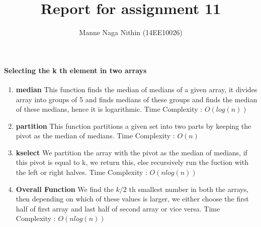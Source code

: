 \documentclass[a4paper,11pt]{article}
\title{Report for assignment 11}
\author{Manne Naga Nithin (14EE10026)}
\begin{document}
\maketitle
\paragraph{Selecting the k th element in two arrays}
\begin{enumerate}

 \item \textbf{median}\newline
This function finds the median of medians of a given array, it divides array into groups of 5 and finds medians of these groups and finds the median of these medians, hence it is logarithmic.\newline
 Time Complexity : $O(log(n))$
 \item \textbf{partition}\newline
 This function partitions a given set into two parts by keeping the pivot as the median of medians.\newline
 Time Complexity : $O(n)$
 \item \textbf{kselect}\newline
 We partition the array with the pivot as the median of medians, if this pivot is equal to k, we return this, else recursively run the fuction with the left or right halves.\newline
 Time Complexity : $O(nlog(n))$
 \item \textbf{Overall Function}\newline
 We find the $k/2$ th smallest number in both the arrays, then depending on which of these values is larger, we either choose the first half of first array and last half of second array or vice versa.\newline
 Time Complexity : $O(nlog(n))$

 
 


\end{enumerate}
\end{document}
